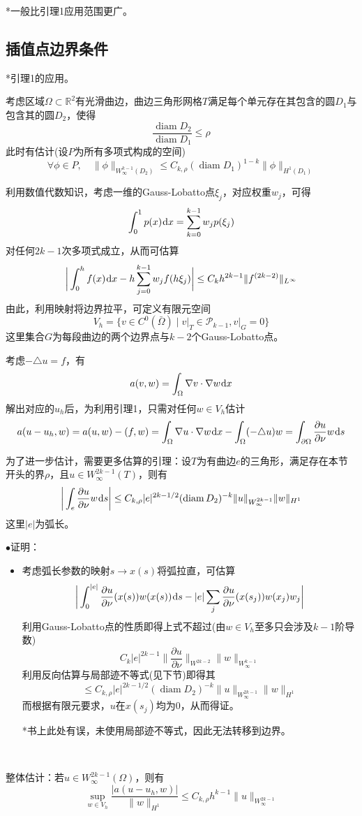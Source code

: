\documentclass[a4paper,UTF8,fontset=windows]{ctexart}
\newcommand*{\dr}{\hspace{0.07em}\mathrm{d}}
\DeclareMathOperator*{\diam}{diam}
\newcommand*{\cp}{\mathcal{P}}
\newcommand{\proo}[1]{{\kaishu $\bullet$证明：
\begin{itemize}
    \item[] #1
\end{itemize}
}}
\begin{document}
*一般比引理1应用范围更广。

\subsection{插值点边界条件}
*引理1的应用。

考虑区域$\Omega\subset\mathbb{R}^2$有光滑曲边，曲边三角形网格$T$满足每个单元存在其包含的圆$D_1$与包含其的圆$D_2$，使得
$$\frac{\diam D_2}{\diam D_1}\le\rho$$
此时有估计(设$P$为所有多项式构成的空间)
$$\forall\phi\in P,\quad\|\phi\|_{W_\infty^{k-1}(D_2)}\le C_{k,\rho}(\diam D_1)^{1-k}\|\phi\|_{H^1(D_1)}$$

利用数值代数知识，考虑一维的Gauss-Lobatto点$\xi_j$，对应权重$w_j$，可得
$$\int_0^1p(x)\dr x=\sum_{k=0}^{k-1}w_j p(\xi_j)$$
对任何$2k-1$次多项式成立，从而可估算
$$\bigg|\int_0^hf(x)\dr x-h\sum_{j=0}^{k-1}w_jf(h\xi_j)\bigg|\le C_kh^{2k-1}\|f^{(2k-2)}\|_{L^\infty}$$
由此，利用映射将边界拉平，可定义有限元空间
$$V_h=\{v\in C^0(\bar\Omega)\mid v\big|_T\in \cp_{k-1},v\big|_G=0\}$$
这里集合$G$为每段曲边的两个边界点与$k-2$个Gauss-Lobatto点。

考虑$-\triangle u=f$，有
$$a(v,w)=\int_\Omega\nabla v\cdot\nabla w\dr x$$
解出对应的$u_h$后，为利用引理1，只需对任何$w\in V_h$估计
$$a(u-u_h,w)=a(u,w)-(f,w)=\int_\Omega\nabla u\cdot\nabla w\dr x-\int_\Omega(-\triangle u)w=\int_{\partial\Omega}\frac{\partial u}{\partial\nu}w\dr s$$

为了进一步估计，需要更多估算的引理：设$T$为有曲边$e$的三角形，满足存在本节开头的界$\rho$，且$u\in W_\infty^{2k-1}(T)$，则有
$$\bigg|\int_e\frac{\partial u}{\partial\nu}w\dr s\bigg|\le C_{k,\rho}|e|^{2k-1/2}(\diam D_2)^{-k}\|u\|_{W_\infty^{2k-1}}\|w\|_{H^1}$$
这里$|e|$为弧长。

\proo{
    考虑弧长参数的映射$s\to x(s)$将弧拉直，可估算
    $$\bigg|\int_0^{|e|}\frac{\partial u}{\partial\nu}(x(s))w(x(s))\dr s-|e|\sum_j\frac{\partial u}{\partial\nu}(x(s_j))w(x_j)w_j\bigg|$$
    利用Gauss-Lobatto点的性质即得上式不超过(由$w\in V_h$至多只会涉及$k-1$阶导数)
    $$C_k|e|^{2k-1}\bigg\|\frac{\partial u}{\partial\nu}\bigg\|_{W^{2k-2}}\|w\|_{W_\infty^{k-1}}$$
    利用反向估算与局部迹不等式(见下节)即得其
    $$\le C_{k,\rho}|e|^{2k-1/2}(\diam D_2)^{-k}\|u\|_{W_\infty^{2k-1}}\|w\|_{H^1}$$
    而根据有限元要求，$u$在$x(s_j)$均为0，从而得证。

    *书上此处有误，未使用局部迹不等式，因此无法转移到边界。
}

\

整体估计：若$u\in W_\infty^{2k-1}(\Omega)$，则有
$$\sup_{w\in V_h}\frac{|a(u-u_h,w)|}{\|w\|_{H^1}}\le C_{k,\rho} h^{k-1}\|u\|_{W_\infty^{2k-1}}$$
\end{document}

